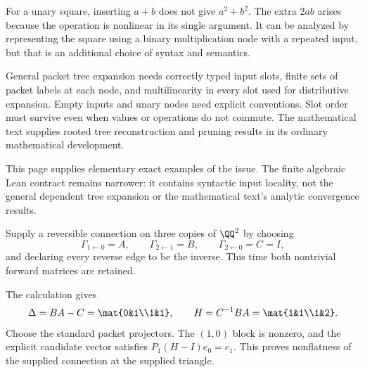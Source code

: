 
For a unary square, inserting $a+b$ does not give $a^2+b^2$. The extra $2ab$ arises because the operation is nonlinear in its single argument. It can be analyzed by representing the square using a binary multiplication node with a repeated input, but that is an additional choice of syntax and semantics.

General packet tree expansion needs correctly typed input slots, finite sets of packet labels at each node, and multilinearity in every slot used for distributive expansion. Empty inputs and unary nodes need explicit conventions. Slot order must survive even when values or operations do not commute. The mathematical text supplies rooted tree reconstruction and pruning results in its ordinary mathematical development.

This page supplies elementary exact examples of the issue. The finite algebraic Lean contract remains narrower: it contains syntactic input locality, not the general dependent tree expansion or the mathematical text's analytic convergence results.


Supply a reversible connection on three copies of $\QQ^2$ by choosing
\[
\Gamma_{1\leftarrow0}=A,\qquad\Gamma_{2\leftarrow1}=B,
\qquad\Gamma_{2\leftarrow0}=C=I,
\]
and declaring every reverse edge to be the inverse. This time both nontrivial forward matrices are retained.


The calculation gives
\[
\Delta=BA-C=\mat{0&1\\1&1},\qquad H=C^{-1}BA=\mat{1&1\\1&2}.
\]
Choose the standard packet projectors. The $(1,0)$ block is nonzero, and the explicit candidate vector satisfies $P_1(H-I)e_0=e_1$. This proves nonflatness of the supplied connection at the supplied triangle.

